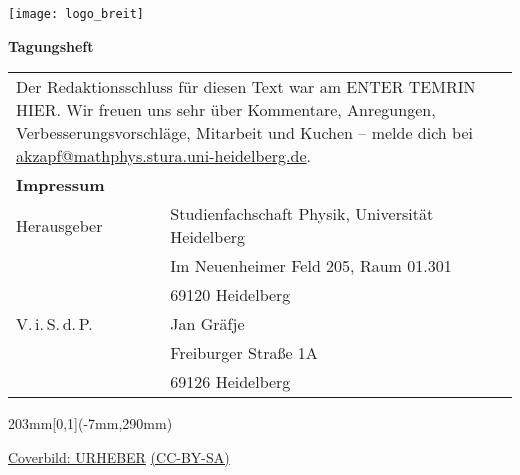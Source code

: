 \documentclass[a5paper]{scrbook}
\begin{document}
\pagestyle{empty}
\centering
\texttt{[image: logo\_breit]} 

\vspace*{14cm} \centering \fontsize{40}{48} \textbf{Tagungsheft}
\normalsize

      
\null
\newpage
{}
\vspace*{\fill}
    \begin{tabular*}{0.77\textwidth}{ll}
        \multicolumn{2}{l}{
            \parbox{0.77\textwidth}{
                Der Redaktionsschluss für diesen Text war am ENTER TEMRIN HIER. Wir freuen uns
                sehr über Kommentare, Anregungen, Verbesserungsvorschläge,
                Mitarbeit und Kuchen -- melde dich bei
                \href{mailto:akzapf@mathphys.stura.uni-heidelberg.de}{akzapf@mathphys.stura.uni-heidelberg.de}.
            }
            \vspace{5cm}
        }\\
        \textbf{Impressum} &\\
        Herausgeber & Studienfachschaft Physik, Universität Heidelberg \\
        & Im Neuenheimer Feld 205, Raum 01.301\\
        & 69120 Heidelberg\\
        V.\,i.\,S.\,d.\,P. & Jan Gräfje\\
        & Freiburger Straße 1A\\
        & 69126 Heidelberg\\
    \end{tabular*}

    \vfill

    \begin{textblock*}{203mm}[0,1](-7mm,290mm)
        \begin{flushright}
            \footnotesize
            \href{http://mathphys.info}{Coverbild: URHEBER} \href{http://creativecommons.org/licenses/by-sa/4.0/}{(CC-BY-SA)}\\  
        \end{flushright}
    \end{textblock*}
\end{document}

